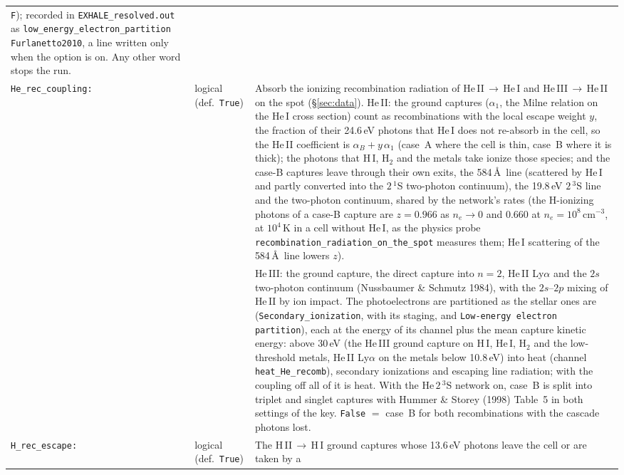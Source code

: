 \documentclass[english,a4paper]{my_memo}
\begin{document}
\begin{longtable}{@{}p{}p{}p{}@{}}
  \texttt{F}); recorded in \texttt{EXHALE\_resolved.out} as
  \texttt{low\_energy\_electron\_partition Furlanetto2010}, a line written
  only when the option is on. Any other word stops the run. \\
\texttt{He\_rec\_coupling:} & logical (def.\ \texttt{True}) & Absorb the
  ionizing recombination radiation of He\,II\,$\to$\,He\,I and
  He\,III\,$\to$\,He\,II on the spot (\S\ref{sec:data}). He\,II: the ground
  captures ($\alpha_1$, the Milne relation on the He\,I cross section) count
  as recombinations with the local escape weight $y$, the fraction of their
  24.6\,eV photons that He\,I does not re-absorb in the cell, so the He\,II
  coefficient is $\alpha_B+y\,\alpha_1$ (case~A where the cell is thin,
  case~B where it is thick); the photons that H\,I, H$_2$ and the metals take
  ionize those species; and the case-B captures leave through their own exits, the
  584\,\AA\ line (scattered by He\,I and partly converted into the $2\,^1$S
  two-photon continuum), the 19.8\,eV $2\,^3$S line and the two-photon
  continuum, shared by the network's rates (the H-ionizing photons of a
  case-B capture are $z=0.966$ as $n_e\to0$ and 0.660 at
  $n_e=10^8$\,cm$^{-3}$, at $10^4$\,K in a cell without He\,I, as the physics
  probe \texttt{recombination\_radiation\_on\_the\_spot} measures them;
  He\,I scattering of the 584\,\AA\ line lowers $z$).
  \\
  & &  He\,III: the ground
  capture, the direct capture into $n=2$, He\,II Ly$\alpha$ and the $2s$
  two-photon continuum (Nussbaumer \& Schmutz 1984), with the $2s$--$2p$
  mixing of He\,II by ion impact. The photoelectrons are partitioned as the
  stellar ones are (\texttt{Secondary\_ionization}, with its staging, and
  \texttt{Low-energy electron partition}), each at the energy of its channel
  plus the mean capture kinetic energy: above 30\,eV (the He\,III ground
  capture on H\,I, He\,I, H$_2$ and the low-threshold metals, He\,II
  Ly$\alpha$ on the metals below 10.8\,eV) into heat (channel
  \texttt{heat\_He\_recomb}), secondary ionizations and escaping line
  radiation; with the coupling off all of it is heat. With the He\,$2\,^3$S network on,
  case~B is split into triplet and singlet captures with Hummer \& Storey
  (1998) Table~5 in both settings of the key. \texttt{False} $=$ case~B for
  both recombinations with the cascade photons lost. \\
\texttt{H\_rec\_escape:} & logical (def.\ \texttt{True}) & The H\,II\,$\to$\,H\,I
  ground captures whose 13.6\,eV photons leave the cell or are taken by a

\end{longtable}
\end{document}
